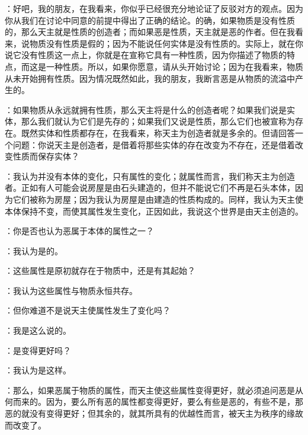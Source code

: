 ：好吧，我的朋友，在我看来，你似乎已经很充分地论证了反驳对方的观点。因为你从我们在讨论中同意的前提中得出了正确的结论。的确，如果物质是没有性质的，那么天主就是性质的创造者；而如果恶是性质，天主就是恶的作者。但在我看来，说物质没有性质是假的；因为不能说任何实体是没有性质的。实际上，就在你说它没有性质这一点上，你就是在宣称它具有一种性质，因为你描述了物质的特点，而这是一种性质。所以，如果你愿意，请从头开始讨论；因为在我看来，物质从未开始拥有性质。因为情况既然如此，我的朋友，我断言恶是从物质的流溢中产生的。\par

：如果物质从永远就拥有性质，那么天主将是什么的创造者呢？如果我们说是实体，那么我们就认为它们是先存的；如果我们又说是性质，那么它们也被宣称为存在。既然实体和性质都存在，在我看来，称天主为创造者就是多余的。但请回答一个问题：你说天主是创造者，是借着将那些实体的存在改变为不存在，还是借着改变性质而保存实体？\par

：我认为并没有本体的变化，只有属性的变化；就属性而言，我们称天主为创造者。正如有人可能会说房屋是由石头建造的，但并不能说它们不再是石头本体，因为它们被称为房屋；因为我认为房屋是由建造的性质构成的。同样，我认为天主使本体保持不变，而使其属性发生变化，正因如此，我说这个世界是由天主创造的。\par

：你是否也认为恶属于本体的属性之一？\par

：我认为是的。\par

：这些属性是原初就存在于物质中，还是有其起始？\par

：我认为这些属性与物质永恒共存。\par

：但你难道不是说天主使属性发生了变化吗？\par

：我是这么说的。\par

：是变得更好吗？\par

：我认为是这样。\par

：那么，如果恶属于物质的属性，而天主使这些属性变得更好，就必须追问恶是从何而来的。因为，要么所有恶的属性都变得更好，要么有些是恶的，有些不是，那恶的就没有变得更好；但其余的，就其所具有的优越性而言，被天主为秩序的缘故而改变了。\par

